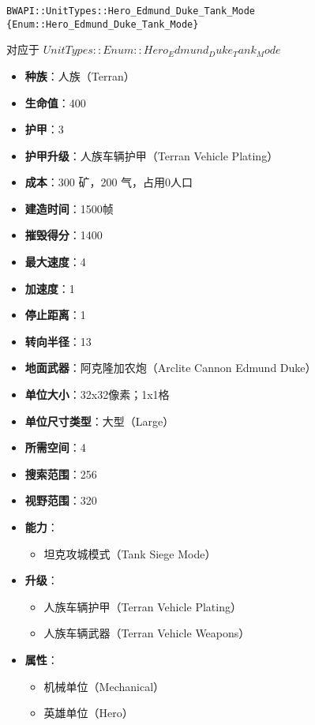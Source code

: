 \begin{tcolorbox}[colback=white, colframe=black!60!white, title=Hero\_Edmund\_Duke\_Tank\_Mode(), arc=0mm]
    \begin{verbatim}
BWAPI::UnitTypes::Hero_Edmund_Duke_Tank_Mode {Enum::Hero_Edmund_Duke_Tank_Mode}
    \end{verbatim}
    对应于  $ UnitTypes::Enum::Hero_Edmund_Duke_Tank_Mode $ 
    \begin{itemize}
        \item \textbf{种族}：人族（Terran）
        \item \textbf{生命值}：400
        \item \textbf{护甲}：3
        \item \textbf{护甲升级}：人族车辆护甲（Terran Vehicle Plating）
        \item \textbf{成本}：300 矿，200 气，占用0人口
        \item \textbf{建造时间}：1500帧
        \item \textbf{摧毁得分}：1400
        \item \textbf{最大速度}：4
        \item \textbf{加速度}：1
        \item \textbf{停止距离}：1
        \item \textbf{转向半径}：13
        \item \textbf{地面武器}：阿克隆加农炮（Arclite Cannon Edmund Duke）
        \item \textbf{单位大小}：32x32像素；1x1格
        \item \textbf{单位尺寸类型}：大型（Large）
        \item \textbf{所需空间}：4
        \item \textbf{搜索范围}：256
        \item \textbf{视野范围}：320
        \item \textbf{能力}：
            \begin{itemize}
                \item 坦克攻城模式（Tank Siege Mode）
            \end{itemize}
        \item \textbf{升级}：
            \begin{itemize}
                \item 人族车辆护甲（Terran Vehicle Plating）
                \item 人族车辆武器（Terran Vehicle Weapons）
            \end{itemize}
        \item \textbf{属性}：
            \begin{itemize}
                \item 机械单位（Mechanical）
                \item 英雄单位（Hero）
            \end{itemize}
    \end{itemize}
\end{tcolorbox}


